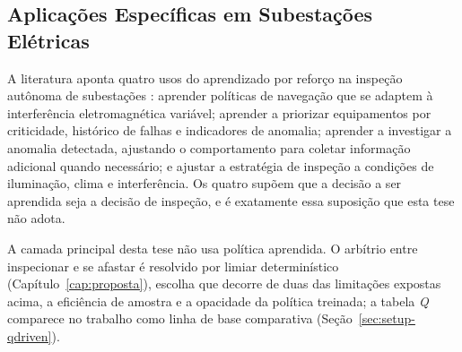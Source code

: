 \subsection{Aplicações Específicas em Subestações Elétricas}

A literatura aponta quatro usos do aprendizado por reforço na inspeção autônoma de
subestações \cite{Ou2024SensorFusionDRL, Wei2024Advancements}: aprender políticas de
navegação que se adaptem à interferência eletromagnética variável; aprender a priorizar
equipamentos por criticidade, histórico de falhas e indicadores de anomalia; aprender a
investigar a anomalia detectada, ajustando o comportamento para coletar informação
adicional quando necessário; e ajustar a estratégia de inspeção a condições de
iluminação, clima e interferência. Os quatro supõem que a decisão a ser aprendida seja a
decisão de inspeção, e é exatamente essa suposição que esta tese não adota.

A camada principal desta tese não usa política aprendida. O arbítrio entre inspecionar e se afastar é resolvido por limiar determinístico (Capítulo~\ref{cap:proposta}), escolha que decorre de duas das limitações expostas acima, a eficiência de amostra e a opacidade da política treinada; a tabela \textit{Q} comparece no trabalho como linha de base comparativa (Seção~\ref{sec:setup-qdriven}).
